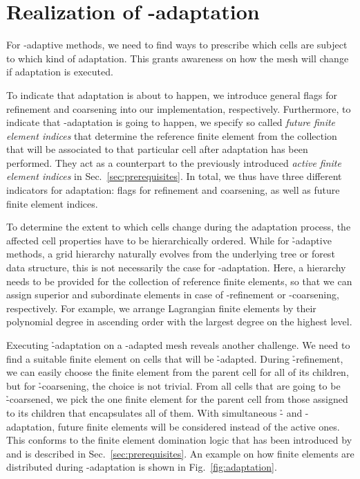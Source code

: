 \section{Realization of \hp-adaptation}
\label{sec:adaptation}

For \hp{}-adaptive methods, we need to find ways to prescribe which cells are subject to which kind of adaptation. This grants awareness on how the mesh will change if adaptation is executed.

To indicate that adaptation is about to happen, we introduce general flags for refinement and coarsening into our implementation, respectively. Furthermore, to indicate that \p-adaptation is going to happen, we specify so called \textit{future finite element indices} that determine the reference finite element from the collection that will be associated to that particular cell after adaptation has been performed. They act as a counterpart to the previously introduced \textit{active finite element indices} in Sec.~\ref{sec:prerequisites}. In total, we thus have three different indicators for adaptation: flags for refinement and coarsening, as well as future finite element indices.

To determine the extent to which cells change during the adaptation process, the affected cell properties have to be hierarchically ordered. While for \h-adaptive methods, a grid hierarchy naturally evolves from the underlying tree or forest data structure, this is not necessarily the case for \p-adaptation. Here, a hierarchy needs to be provided for the collection of reference finite elements, so that we can assign superior and subordinate elements in case of \p-refinement or \p-coarsening, respectively. For example, we arrange Lagrangian finite elements by their polynomial degree in ascending order with the largest degree on the highest level.

Executing \h-adaptation on a \p-adapted mesh reveals another challenge. We need to find a suitable finite element on cells that will be \h-adapted. During \h-refinement, we can easily choose the finite element from the parent cell for all of its children, but for \h-coarsening, the choice is not trivial. From all cells that are going to be \h-coarsened, we pick the one finite element for the parent cell from those assigned to its children that encapsulates all of them. With simultaneous \h- and \p-adaptation, future finite elements will be considered instead of the active ones. This conforms to the finite element domination logic that has been introduced by \textcite{bangerth2009} and is described in Sec.~\ref{sec:prerequisites}. An example on how finite elements are distributed during \hp-adaptation is shown in Fig.~\ref{fig:adaptation}.

